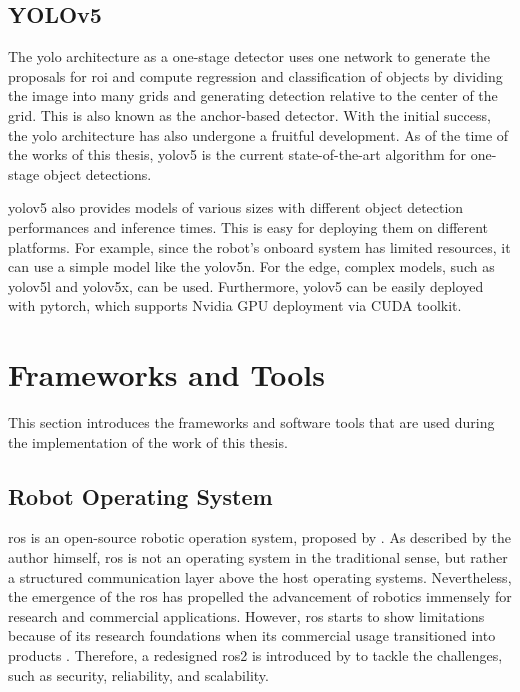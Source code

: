 \subsection{YOLOv5}

The \gls{yolo} architecture \cite{Redmon2016} as a one-stage detector uses one network to generate the proposals for \gls{roi} and compute regression and classification of objects by dividing the image into many grids and generating detection relative to the center of the grid. This is also known as the anchor-based detector. With the initial success, the \gls{yolo} architecture has also undergone a fruitful development. As of the time of the works of this thesis, \gls{yolo}v5 \cite{Jocher2022} is the current state-of-the-art algorithm for one-stage object detections. 

\gls{yolo}v5 also provides models of various sizes with different object detection performances and inference times. This is easy for deploying them on different platforms. For example, since the robot's onboard system has limited resources, it can use a simple model like the \gls{yolo}v5n. For the edge, complex models, such as \gls{yolo}v5l and \gls{yolo}v5x, can be used. Furthermore, \gls{yolo}v5 can be easily deployed with \gls{pytorch}, which supports Nvidia GPU deployment via CUDA toolkit. 


\section{Frameworks and Tools}\label{sec:frameworks_and_tools}

This section introduces the frameworks and software tools that are used during the implementation of the work of this thesis. 

\subsection{Robot Operating System}

\gls{ros} is an open-source robotic operation system, proposed by \citeauthor*{Quigley2009} \cite{Quigley2009}. As described by the author himself, \gls{ros} is not an operating system in the traditional sense, but rather a structured communication layer above the host operating systems. Nevertheless, the emergence of the \gls{ros} has propelled the advancement of robotics immensely for research and commercial applications. However, \gls{ros} starts to show limitations because of its research foundations when its commercial usage transitioned into products \cite{Macenski2022}. Therefore, a redesigned \gls{ros}2 is introduced by \citeauthor*{Macenski2022} \cite{Macenski2022} to tackle the challenges, such as security, reliability, and scalability.

